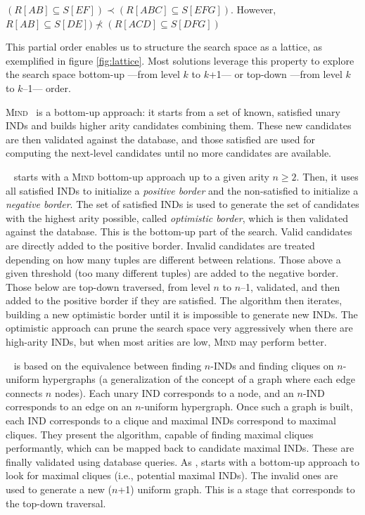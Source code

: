 \begin{example}
$(R[AB] \subseteq S[EF]) \prec (R[ABC] \subseteq S[EFG])$. However,
$R[AB] \subseteq S[DE]) \nprec (R[ACD] \subseteq S[DFG])$
\end{example}

This partial order enables us to structure the search space as a lattice, as exemplified in figure
\ref{fig:lattice}. Most solutions leverage this property to explore the search space bottom-up
---from level $k$ to $k$+1--- or top-down ---from level $k$ to $k$--1--- order.

\textsc{Mind}~\cite{DeMarchi2002} is a bottom-up approach: it starts
from a set of known, satisfied unary \glspl{IND} and builds higher arity candidates
combining them.
These new candidates are then validated against the database, and those satisfied
are used for computing the next-level candidates until no more candidates are available.

\Zigzag~\cite{DeMarchi2003zigzag} starts with a \textsc{Mind} bottom-up approach
up to a given arity $n \ge 2$. Then, it uses all satisfied \glspl{IND} to initialize a \textit{positive border}
and the non-satisfied to initialize a \textit{negative border}. The set of satisfied \glspl{IND}
is used to generate the set of candidates with the highest arity possible, called
\textit{optimistic border},
which is then validated against the database. This is the bottom-up part of the search.
Valid candidates are directly added to the positive border.
Invalid candidates are treated depending on how many tuples are different between relations.
Those above a given threshold (too many different tuples) are added to the negative border.
Those below are top-down traversed, from level $n$ to $n$--1, validated, and then added
to the positive border if they are satisfied. The algorithm then iterates, building a new
optimistic border until it is impossible to generate new \glspl{IND}. The optimistic approach
can prune the search space very aggressively when there are high-arity \glspl{IND},
but when most arities are low,  \textsc{Mind} may perform better.

\Find~\cite{koeller2003discovery} is based on the equivalence
between finding $n$-INDs and finding cliques on $n$-uniform hypergraphs (a generalization
of the concept of a graph where each edge connects $n$ nodes). Each unary \gls{IND} corresponds
to a node, and an $n$-IND corresponds to an edge on an $n$-uniform hypergraph.
Once such a graph is built, each \gls{IND} corresponds to a clique and maximal \glspl{IND}
correspond to maximal cliques. They present the \Hyperclique algorithm,
capable of finding maximal cliques performantly, which can be mapped back to candidate
maximal \glspl{IND}. These are finally validated using database queries.
As \Zigzag, \Find starts with a bottom-up
approach to look for maximal cliques (i.e., potential maximal \glspl{IND}). The invalid ones
are used to generate a new ($n$+1) uniform graph. This is a stage that corresponds to the top-down
traversal.

